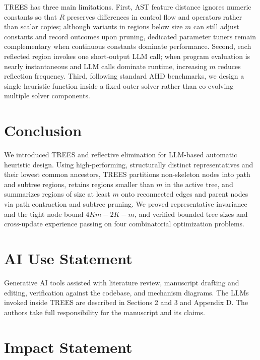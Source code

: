 \documentclass{article}
\begin{document}
TREES has three main limitations. First, AST feature distance ignores numeric constants so that \(R\) preserves differences in control flow and operators rather than scalar copies; although variants in regions below size \(m\) can still adjust constants and record outcomes upon pruning, dedicated parameter tuners \citep{irace} remain complementary when continuous constants dominate performance. Second, each reflected region invokes one short-output LLM call; when program evaluation is nearly instantaneous and LLM calls dominate runtime, increasing \(m\) reduces reflection frequency. Third, following standard AHD benchmarks, we design a single heuristic function inside a fixed outer solver rather than co-evolving multiple solver components.

\section{Conclusion}\label{conclusion}

We introduced TREES and reflective elimination for LLM-based automatic heuristic design. Using high-performing, structurally distinct representatives and their lowest common ancestors, TREES partitions non-skeleton nodes into path and subtree regions, retains regions smaller than \(m\) in the active tree, and summarizes regions of size at least \(m\) onto reconnected edges and parent nodes via path contraction and subtree pruning. We proved representative invariance and the tight node bound \(4Km-2K-m\), and verified bounded tree sizes and cross-update experience passing on four combinatorial optimization problems.

\section*{AI Use Statement}\label{ai-use-statement}

Generative AI tools assisted with literature review, manuscript drafting and editing, verification against the codebase, and mechanism diagrams. The LLMs invoked inside TREES are described in Sections 2 and 3 and Appendix D. The authors take full responsibility for the manuscript and its claims.

\section*{Impact Statement}\label{impact-statement}
\end{document}
